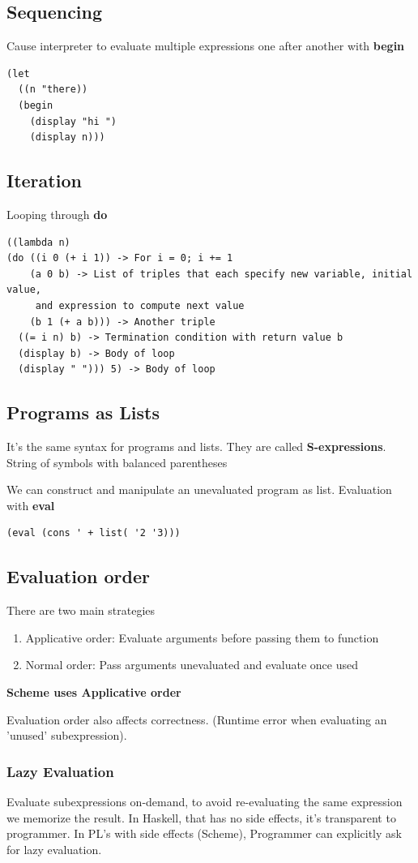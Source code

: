 \documentclass{article}
\begin{document}
\subsection{Sequencing}
Cause interpreter to evaluate multiple expressions one after another with \textbf{begin}
\begin{lstlisting}
(let 
  ((n "there))
  (begin
    (display "hi ")
    (display n)))
\end{lstlisting}
\subsection{Iteration}
Looping through \textbf{do}
\begin{lstlisting}
((lambda n)
(do ((i 0 (+ i 1)) -> For i = 0; i += 1
    (a 0 b) -> List of triples that each specify new variable, initial value,
     and expression to compute next value 
    (b 1 (+ a b))) -> Another triple
  ((= i n) b) -> Termination condition with return value b
  (display b) -> Body of loop
  (display " "))) 5) -> Body of loop
\end{lstlisting}

\subsection{Programs as Lists}
It's the same syntax for programs and lists. They are called \textbf{S-expressions}. String of symbols with balanced parentheses

We can construct and manipulate an unevaluated program as list. Evaluation with \textbf{eval}

\begin{lstlisting}
(eval (cons ' + list( '2 '3)))
\end{lstlisting}
\subsection{Evaluation order}
There are two main strategies
\begin{enumerate}
  \item Applicative order: Evaluate arguments before passing them to function
  \item Normal order: Pass arguments unevaluated and evaluate once used
\end{enumerate}
\textbf{Scheme uses Applicative order}

Evaluation order also affects correctness. (Runtime error when evaluating an 'unused' subexpression).
\subsubsection{Lazy Evaluation}
Evaluate subexpressions on-demand, to avoid re-evaluating the same expression we memorize the result. In Haskell, that has no side effects, it's transparent to programmer. In PL's with side effects (Scheme), Programmer can explicitly ask for lazy evaluation.
\end{document}

